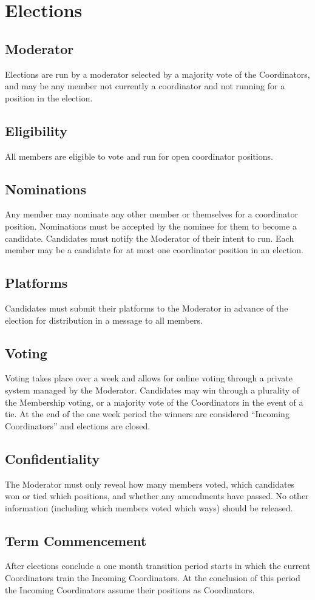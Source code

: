 \chapter{Elections}\label{sec:elections}

\section{Moderator}\label{sec:moderator}
Elections are run by a moderator selected by a majority vote of the Coordinators, and may be any member not currently a coordinator and not running for a position in the election.

\section{Eligibility}\label{sec:eligibility}
All members are eligible to vote and run for open coordinator positions.

\section{Nominations}\label{sec:nominations}
Any member may nominate any other member or themselves for a coordinator position. Nominations must be accepted by the nominee for them to become a candidate. Candidates must notify the Moderator of their intent to run. Each member may be a candidate for at most one coordinator position in an election.

\section{Platforms}\label{sec:platforms}
Candidates must submit their platforms to the Moderator in advance of the election for distribution in a message to all members.

\section{Voting}\label{sec:voting}
Voting takes place over a week and allows for online voting through a private system managed by the Moderator. Candidates may win through a plurality of the Membership voting, or a majority vote of the Coordinators in the event of a tie. At the end of the one week period the winners are considered ``Incoming Coordinators'' and elections are closed.

\section{Confidentiality}\label{sec:confidentiality}
The Moderator must only reveal how many members voted, which candidates won or tied which positions, and whether any amendments have passed. No other information (including which members voted which ways) should be released.

\section{Term Commencement}\label{sec:term_commencement}
After elections conclude a one month transition period starts in which the current Coordinators train the Incoming Coordinators. At the conclusion of this period the Incoming Coordinators assume their positions as Coordinators.

